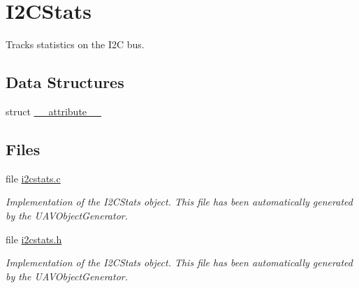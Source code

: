 \hypertarget{group___i2_c_stats}{\section{\-I2\-C\-Stats}
\label{group___i2_c_stats}
}


\-Tracks statistics on the \-I2\-C bus.  


\subsection*{\-Data \-Structures}
\begin{DoxyCompactItemize}
\item 
struct \hyperlink{struct____attribute____}{\-\_\-\-\_\-attribute\-\_\-\-\_\-}
\end{DoxyCompactItemize}
\subsection*{\-Files}
\begin{DoxyCompactItemize}
\item 
file \hyperlink{i2cstats_8c}{i2cstats.\-c}
\begin{DoxyCompactList}\small\item\em \-Implementation of the \-I2\-C\-Stats object. \-This file has been automatically generated by the \-U\-A\-V\-Object\-Generator. \end{DoxyCompactList}\item 
file \hyperlink{i2cstats_8h}{i2cstats.\-h}
\begin{DoxyCompactList}\small\item\em \-Implementation of the \-I2\-C\-Stats object. \-This file has been automatically generated by the \-U\-A\-V\-Object\-Generator. \end{DoxyCompactList}\end{DoxyCompactItemize}
